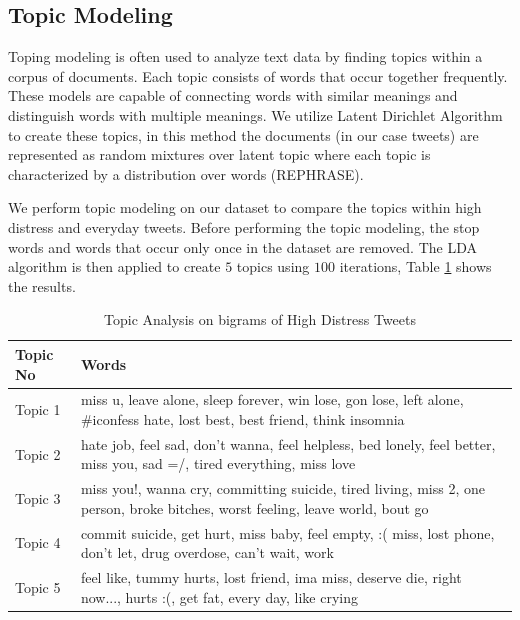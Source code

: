 \documentclass[11pt]{article}
\begin{document}
\subsection{Topic Modeling}

Toping modeling is often used to analyze text data by finding topics within a corpus of documents. Each topic consists of words that occur together frequently. These models are capable of connecting words with similar meanings and distinguish words with multiple meanings. We utilize  Latent Dirichlet Algorithm  \cite{Blei} to create these topics, in this method the documents (in our case tweets) are represented as random mixtures over latent topic where each topic is characterized by a distribution over words (REPHRASE). 

We perform topic modeling on our dataset to compare the topics within high distress and everyday tweets. Before performing the topic modeling, the stop words and words that occur only once in the dataset are removed. The LDA algorithm is then applied to create $5$ topics using $100$ iterations, Table \ref{tab:tm} shows the results.

\begin{table}[h]
    \centering
    \begin{tabular}{|p{0.7cm}|p{4cm}|}
    \hline
    \textbf{Topic No } & \textbf{Words} \\ \hline
    \vfill \vfill Topic 1 & miss u, leave alone, sleep forever, win lose, gon lose, left alone, \#iconfess hate, lost best, best friend, think insomnia \\ \hline
    \vfill \vfill Topic 2 & hate job, feel sad, don't wanna, feel helpless, bed lonely, feel better, miss you, sad =/, tired everything, miss love\\ \hline
    \vfill \vfill Topic 3 & miss you!, wanna cry, committing suicide, tired living, miss 2, one person, broke bitches, worst feeling, leave world, bout go \\ \hline
    \vfill \vfill Topic 4 & commit suicide, get hurt, miss baby, feel empty, :( miss, lost phone, don't let, drug overdose, can't wait, \@ work \\ \hline
     \vfill \vfill Topic 5 & feel like, tummy hurts, lost friend, ima miss, deserve die, right now..., hurts :(, get fat, every day, like crying  \\ \hline
    \end{tabular}
 \caption {Topic Analysis on bigrams of High Distress Tweets }

\label{tab:tm}
\end{table}
\end{document}
